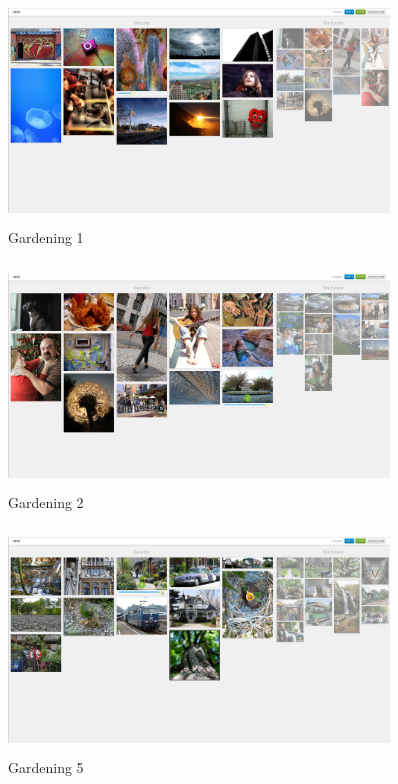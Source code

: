 \documentclass[english]{tktltiki}
\begin{document}
\begin{figure}[!h]
  \centering
    \includegraphics[width=0.90\textwidth,height=6cm]{figures/gardening_1.jpg}
    \caption{Gardening 1}
    \label{gardening_1}
\end{figure}

\begin{figure}[!h]
  \centering
    \includegraphics[width=0.90\textwidth,height=6cm]{figures/gardening_2.jpg}
    \caption{Gardening 2}
    \label{gardening_2}
\end{figure}

\begin{figure}[!h]
  \centering
    \includegraphics[width=0.90\textwidth,height=6cm]{figures/gardening_5.jpg}
    \caption{Gardening 5}
    \label{gardening_5}
\end{figure}
\end{document}
